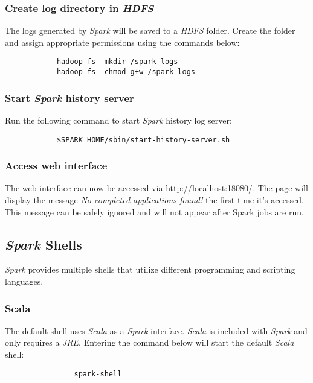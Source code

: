 \documentclass{article}
\begin{document}
            \subsubsection{Create log directory in \emph{HDFS}}
            The logs generated by \emph{Spark} will be saved to a \emph{HDFS} folder. Create the folder
            and assign appropriate permissions using the commands below:
            \begin{verbatim}
            hadoop fs -mkdir /spark-logs
            hadoop fs -chmod g+w /spark-logs
            \end{verbatim}

            \subsubsection{Start \emph{Spark} history server}
            \label{subsec:sparklog}
            Run the following command to start \emph{Spark} history log server:
            \begin{verbatim}
            $SPARK_HOME/sbin/start-history-server.sh
            \end{verbatim}

            \subsubsection{Access web interface}
            The web interface can now be accessed via \url{http://localhost:18080/}. The page will
            display the message \emph{No completed applications found!} the first time it's accessed.
            This message can be safely ignored and will not appear after Spark jobs are run.

        \subsection{\emph{Spark} Shells}
        \emph{Spark} provides multiple shells that utilize different programming and scripting languages.

            \subsubsection{Scala}
            The default shell uses \emph{Scala} as a \emph{Spark} interface. \emph{Scala} is included
            with \emph{Spark} and only requires a \emph{JRE}. Entering the command below will start
            the default \emph{Scala} shell:
            \begin{verbatim}
                spark-shell
            \end{verbatim}
\end{document}
